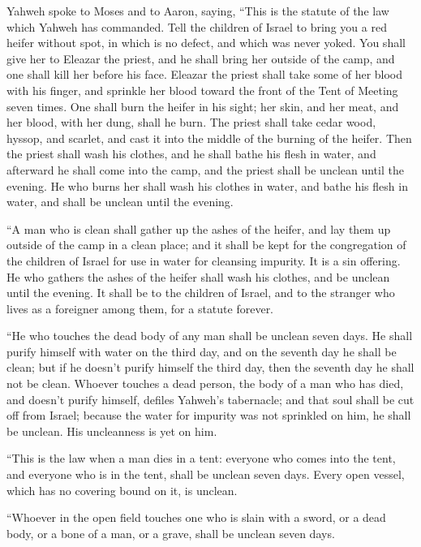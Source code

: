  Yahweh spoke to Moses and to Aaron, saying, 
``This is the statute of the law which Yahweh has commanded. Tell the
children of Israel to bring you a red heifer without spot, in which is
no defect, and which was never yoked.  You shall give her to
Eleazar the priest, and he shall bring her outside of the camp, and one
shall kill her before his face.  Eleazar the priest shall
take some of her blood with his finger, and sprinkle her blood toward
the front of the Tent of Meeting seven times.  One shall
burn the heifer in his sight; her skin, and her meat, and her blood,
with her dung, shall he burn.  The priest shall take cedar
wood, hyssop, and scarlet, and cast it into the middle of the burning of
the heifer.  Then the priest shall wash his clothes, and he
shall bathe his flesh in water, and afterward he shall come into the
camp, and the priest shall be unclean until the evening.  He
who burns her shall wash his clothes in water, and bathe his flesh in
water, and shall be unclean until the evening.

 ``A man who is clean shall gather up the ashes of the
heifer, and lay them up outside of the camp in a clean place; and it
shall be kept for the congregation of the children of Israel for use in
water for cleansing impurity. It is a sin offering.  He who
gathers the ashes of the heifer shall wash his clothes, and be unclean
until the evening. It shall be to the children of Israel, and to the
stranger who lives as a foreigner among them, for a statute forever.

 ``He who touches the dead body of any man shall be unclean
seven days.  He shall purify himself with water on the
third day, and on the seventh day he shall be clean; but if he doesn't
purify himself the third day, then the seventh day he shall not be
clean.  Whoever touches a dead person, the body of a man
who has died, and doesn't purify himself, defiles Yahweh's tabernacle;
and that soul shall be cut off from Israel; because the water for
impurity was not sprinkled on him, he shall be unclean. His uncleanness
is yet on him.

 ``This is the law when a man dies in a tent: everyone who
comes into the tent, and everyone who is in the tent, shall be unclean
seven days.  Every open vessel, which has no covering bound
on it, is unclean.

 ``Whoever in the open field touches one who is slain with
a sword, or a dead body, or a bone of a man, or a grave, shall be
unclean seven days.

